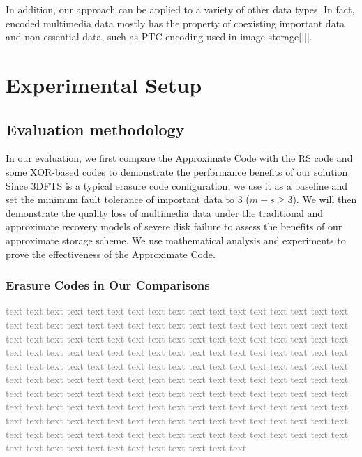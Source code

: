\documentclass[sigconf]{acmart}
\begin{document}
In addition, our approach can be applied to a variety of other data types. In fact, encoded multimedia data mostly has the property of coexisting important data and non-essential data, such as PTC encoding used in image storage[][].

\section{Experimental Setup}

\subsection{Evaluation methodology}
In our evaluation, we first compare the Approximate Code with the RS code and some XOR-based codes to demonstrate the performance benefits of our solution. Since 3DFTS is a typical erasure code configuration, we use it as a baseline and set the minimum fault tolerance of important data to 3 ($ m + s \geqslant 3 $). We will then demonstrate the quality loss of multimedia data under the traditional and approximate recovery models of severe disk failure to assess the benefits of our approximate storage scheme. We use mathematical analysis and experiments to prove the effectiveness of the Approximate Code.



\subsubsection{Erasure Codes in Our Comparisons}
\textcolor{gray}{
    text text text text text text text text text text text text text text text text text text text text text text text text text text text text text text text text text text text text text text text text text text text text text text text text text text text text text text text text text text text text text text text text text text text text text text text text text text text text text text text text text text text text text text text text text text text text text text text text text text text text text text text text text text text text text text text text text text text text text text text text text text text text text text text text text text text text text text text text text text text text text text text text text text text text text text text text text text text text text text text text text text text text text text text text text text text text text text text text text text text text text text
}
\end{document}
